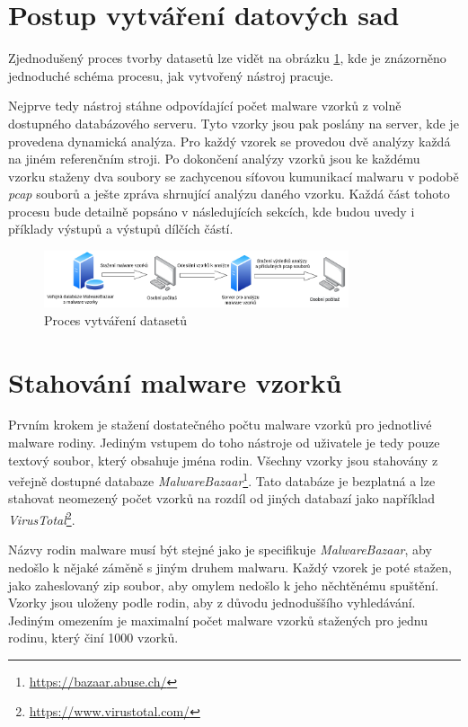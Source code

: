 \section{Postup vytváření datových sad}
Zjednodušený proces tvorby datasetů lze vidět na obrázku \ref{pipeline}, kde je znázorněno jednoduché schéma procesu, jak vytvořený nástroj pracuje. 

Nejprve tedy nástroj stáhne odpovídající počet malware vzorků z volně dostupného databázového serveru. Tyto vzorky jsou pak poslány na server, kde je provedena dynamická analýza.
Pro každý vzorek se provedou dvě analýzy každá na jiném referenčním stroji.
Po dokončení analýzy vzorků jsou ke každému vzorku staženy dva soubory se zachycenou síťovou kumunikací malwaru v podobě \textit{pcap} souborů a ješte zpráva shrnující analýzu daného vzorku.
Každá část tohoto procesu bude detailně popsáno v následujících sekcích, kde budou uvedy i příklady výstupů a výstupů dílčích částí.\\

\begin{figure}[h]
	\centering
        \includegraphics[width=0.8\textwidth]{obrazky/pipeline.png}
	\caption{Proces vytváření datasetů}
    \label{pipeline}
\end{figure}

\section{Stahování malware vzorků}
Prvním krokem je stažení dostatečného počtu malware vzorků pro jednotlivé malware rodiny. Jediným vstupem do toho nástroje od uživatele je tedy pouze textový soubor, který obsahuje
jména rodin. Všechny vzorky jsou stahovány z veřejně dostupné databaze \textit{MalwareBazaar}\footnote{\href{https://bazaar.abuse.ch/}{https://bazaar.abuse.ch/}}. Tato databáze je 
bezplatná a lze stahovat neomezený počet vzorků na rozdíl od jiných databazí jako například \textit{VirusTotal}\footnote{\href{https://www.virustotal.com/gui/home/upload}{https://www.virustotal.com/}}.

Názvy rodin malware musí být stejné jako je specifikuje \textit{MalwareBazaar}, aby nedošlo k nějaké záměně s jiným druhem malwaru. Každý vzorek je poté stažen, jako zaheslovaný zip soubor, aby omylem nedošlo k 
jeho něchtěnému spuštění. Vzorky jsou uloženy podle rodin, aby z důvodu jednoduššího vyhledávání. Jediným omezením je maximalní počet malware vzorků stažených pro jednu rodinu, který činí 1000 vzorků.

